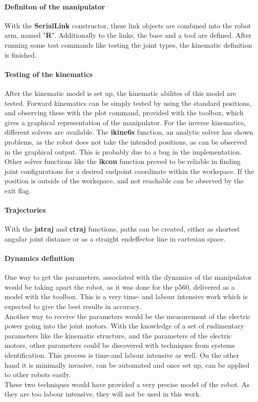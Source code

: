 \paragraph{Definiton of the manipulator }
With the \textbf{SerialLink} constructor, these link objects are combined into the robot arm, named "\textbf{R}". 
Additionally to the links, the base and a tool are defined. After running some test commands like testing the joint types, the kinematic definition is finished.

\paragraph{Testing of the kinematics}
After the kinematic model is set up, the kinematic abilites of this model are tested. 
Forward kinematics can be simply tested by using the standard positions, and observing these with the plot command, provided with the toolbox, which gives a graphical representation of the manipulator.
For the inverse kinematics, different solvers are available. The \textbf{ikine6s} function, an analytic solver has shown problems, as the robot does not take the intended positions, as can be observed in the graphical output. This is probably due to a bug in the implementation.
Other solver functions like the \textbf{ikcon} function proved to be reliable in finding joint configurations for a desired endpoint coordinate within the workspace. If the position is outside of the workspace, and not reachable can be observed by the exit flag.

\paragraph{Trajectories}
With the \textbf{jatraj} and \textbf{ctraj} functions, paths can be created, either as shortest angular joint distance or as a straight endeffector line in cartesian space.

\paragraph{Dynamics definition}
One way to get the parameters, associated with the dynamics of the manipulator would be taking apart the robot, as it was done for the p560, delivered as a model with the toolbox.
This is a very time- and labour intensive work which is expected to give the best results in accuracy.\\
Another way to receive the parameters would be the measurement of the electric power going into the joint motors. With the knowledge of a set of rudimentary parameters like the kinematic structure, and the parameters of the electric motors, other parameters could be discovered with techniques from systems identification. This process is time-and labour intensive as well. On the other hand it is minimally invasive, can be automated and once set up, can be applied to other robots easily.\\
These two techniques would have provided a very precise model of the robot. As they are too labour intensive, they will not be used in this work.\\

